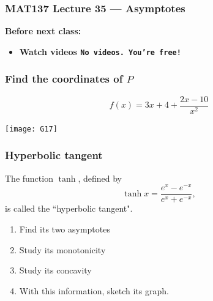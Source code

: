 \documentclass[14pt]{beamer}
\begin{document}
\begin{frame}
	\frametitle{MAT137 Lecture 35 --- Asymptotes}

	\vfill
	{\bf Before next class:}
		\begin{itemize} \normalsize
			\item {\bf Watch videos {\texttt{No videos. You're free!}}}
		\end{itemize}
\end{frame}

	\begin{frame}[t]
		\frametitle{Find the coordinates of $P$ }

		\[
			f(x) = 3x+4 + \frac{2x-10}{x^{2}}
		\]

		\begin{center}
			\texttt{[image: G17]}
		\end{center}
	\end{frame}

	\begin{frame}[t]
		\frametitle{Hyperbolic tangent}

		The function $\tanh$, defined by
		\[
			\tanh x = \frac{e^{x} - e^{-x}}{e^{x} + e^{-x}},
		\]
		is called the ``hyperbolic tangent".
		\begin{enumerate}
			\item Find its two asymptotes

			\item Study its monotonicity

			\item Study its concavity

			\item With this information, sketch its graph.
		\end{enumerate}
	\end{frame}
\end{document}
